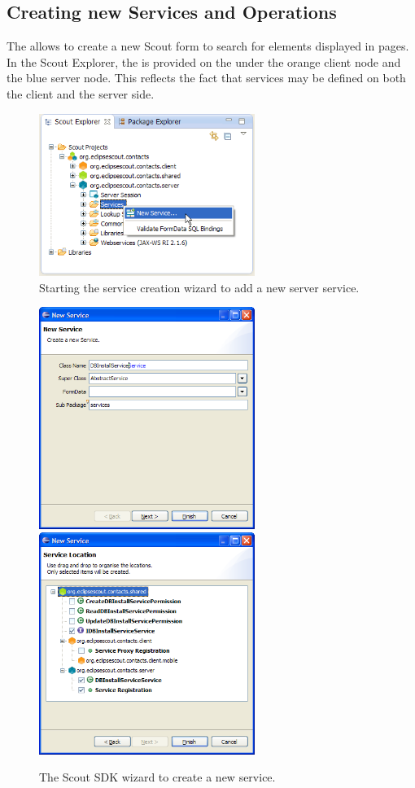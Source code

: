\documentclass[a4paper,10pt,twoside]{book}
\begin{document}
\subsection{Creating new Services and Operations}

The  allows to create a new Scout form to search for elements displayed in pages.  
In the Scout Explorer, the  is provided on the  under the orange client node and the blue server node. 
This reflects the fact that services may be defined on both the client and the server side. 

\begin{figure}
\includegraphics[width=7cm]{wizard_service_contextmenu.png}
\caption{Starting the service creation wizard to add a new server service.}
\end{figure}

\begin{figure}
\includegraphics[width=7cm]{wizard_service_1.png} \hspace{5mm}
\includegraphics[width=7cm]{wizard_service_2.png}
\caption{The Scout SDK wizard to create a new service.}
\end{figure}
\end{document}
